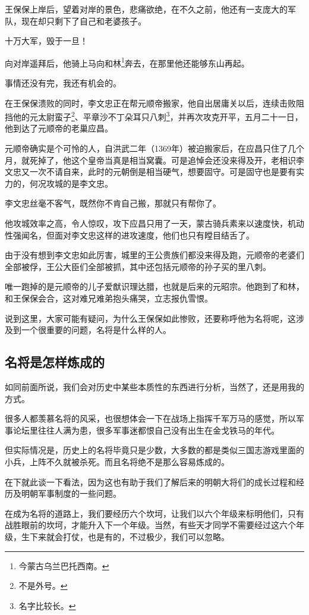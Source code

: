 \begin{multicols}{\theparacolNo}
		王保保上岸后，望着对岸的景色，悲痛欲绝，在不久之前，他还有一支庞大的军队，现在却只剩下了自己和老婆孩子。

		十万大军，毁于一旦！

		向对岸遥拜后，他骑上马向和林\footnote{今蒙古乌兰巴托西南。}奔去，在那里他还能够东山再起。

		事情还没有完，我还有机会的。

		在王保保溃败的同时，李文忠正在帮元顺帝搬家，他自出居庸关以后，连续击败阻挡他的元太尉蛮子\footnote{不是外号。}、平章沙不丁朵耳只八刺\footnote{名字比较长。}，并再次攻克开平，五月二十一日，他到达了元顺帝的老巢应昌。

		元顺帝确实是个可怜的人，自洪武二年（1369年）被迫搬家后，在应昌只住了几个月，就死掉了，他这个皇帝当真是相当窝囊。可是追悼会还没来得及开，老相识李文忠又一次不请自来，此时的元朝倒是相当硬气，想要固守。可是固守也是要有实力的，何况攻城的是李文忠。

		李文忠丝毫不客气，既然你不肯自己搬，那就只有帮你了。

		他攻城效率之高，令人惊叹，攻下应昌只用了一天，蒙古骑兵素来以速度快，机动性强闻名，但面对李文忠这样的进攻速度，他们也只有瞠目结舌了。

		由于没有想到李文忠如此厉害，城里的王公贵族们都没来得及跑，元顺帝的老婆们全部被俘，王公大臣们全部被抓，其中还包括元顺帝的孙子买的里八刺。

		唯一跑掉的是元顺帝的儿子爱猷识理达腊，也就是后来的元昭宗。他跑到了和林，和王保保会合，这对难兄难弟抱头痛哭，立志报仇雪恨。

		说到这里，大家可能有疑问，为什么王保保如此惨败，还要称呼他为名将呢，这涉及到一个很重要的问题，名将是什么样的人。

		\subsection{名将是怎样炼成的}
		如同前面所说，我们会对历史中某些本质性的东西进行分析，当然了，还是用我的方式。

		很多人都羡慕名将的风采，也很想体会一下在战场上指挥千军万马的感觉，所以军事论坛里往往人满为患，很多军事迷都恨自己没有出生在金戈铁马的年代。

		但实际情况是，历史上的名将毕竟只是少数，大多数的都是类似三国志游戏里面的小兵，上阵不久就被杀死。而且名将绝不是那么容易炼成的。

		在下就此谈一下看法，因为这也有助于我们了解后来的明朝大将们的成长过程和经历及明朝军事制度的一些问题。

		在成为名将的道路上，我们要经历六个坎坷，让我们以六个年级来标明他们，只有战胜眼前的坎坷，才能升入下一个年级。当然，有些天才同学不需要经过这六个年级，生下来就会打仗，也是有的，不过极少，我们可以忽略。


\end{multicols}
